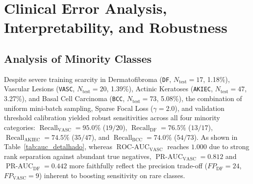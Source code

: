 \documentclass[11pt,a4paper]{article}
\begin{document}
\section{Clinical Error Analysis, Interpretability, and Robustness}

\subsection{Analysis of Minority Classes}
Despite severe training scarcity in Dermatofibroma (\texttt{DF}, $N_{\text{test}}=17$, 1.18\%), Vascular Lesions (\texttt{VASC}, $N_{\text{test}}=20$, 1.39\%), Actinic Keratoses (\texttt{AKIEC}, $N_{\text{test}}=47$, 3.27\%), and Basal Cell Carcinoma (\texttt{BCC}, $N_{\text{test}}=73$, 5.08\%), the combination of uniform mini-batch sampling, Sparse Focal Loss ($\gamma=2.0$), and validation threshold calibration yielded robust sensitivities across all four minority categories: $\operatorname{Recall}_{\text{VASC}} = 95.0\%$ ($19/20$), $\operatorname{Recall}_{\text{DF}} = 76.5\%$ ($13/17$), $\operatorname{Recall}_{\text{AKIEC}} = 74.5\%$ ($35/47$), and $\operatorname{Recall}_{\text{BCC}} = 74.0\%$ ($54/73$). As shown in Table~\ref{tab:auc_detalhado}, whereas $\operatorname{ROC-AUC}_{\text{VASC}}$ reaches $1.000$ due to strong rank separation against abundant true negatives, $\operatorname{PR-AUC}_{\text{VASC}} = 0.812$ and $\operatorname{PR-AUC}_{\text{DF}} = 0.442$ more faithfully reflect the precision trade-off ($FP_{\text{DF}} = 24$, $FP_{\text{VASC}} = 9$) inherent to boosting sensitivity on rare classes.
\end{document}
